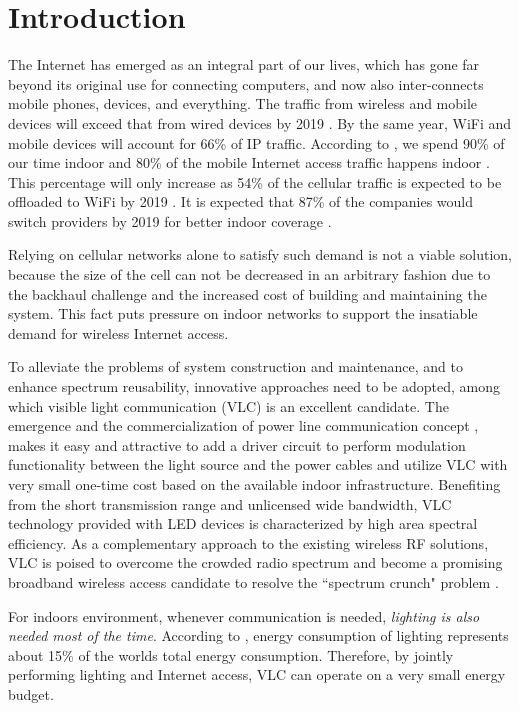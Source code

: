\documentclass[10pt,journal]{IEEEtran}
\begin{document}
\section{Introduction}\label{introduction}
The Internet has emerged as an integral part of our lives, which has gone far beyond its original use for connecting computers, and now also inter-connects mobile phones, devices, and everything. The traffic from wireless and mobile devices will exceed that from wired devices by 2019 \cite{cisco2015cisco}. By the same year, WiFi and mobile devices will account for 66\% of IP traffic. According to \cite{Ericsson2013report}, we spend 90\% of our time indoor and 80\% of the mobile Internet access traffic happens indoor \cite{Alcatel2015inbuilding,Cisco2015service}. This percentage will only increase as 54\% of the cellular traffic is expected to be offloaded to WiFi by 2019 \cite{index2015global}. It is expected that 87\% of the companies would switch providers by 2019 for better indoor coverage \cite{Alcatel2015inbuilding}.


Relying on cellular networks alone to satisfy such demand is not a viable solution, because the size of the cell can not be decreased in an arbitrary fashion due to the backhaul challenge \cite{chia2009next} and the increased cost of building and maintaining the system. This fact puts pressure on indoor networks to support the insatiable demand for wireless Internet access.


To alleviate the problems of system construction and maintenance, and to enhance spectrum reusability, innovative approaches need to be adopted, among which visible light communication (VLC) is an excellent candidate. The emergence and the commercialization of power line communication concept \cite{tsuzuki2012feasibility,tonello2008challenges}, makes it easy and attractive to add a driver circuit to perform modulation functionality between the light source and the power cables and utilize VLC with very small one-time cost based on the available indoor infrastructure. Benefiting from the short transmission range and unlicensed wide bandwidth, VLC technology provided with LED devices is characterized by high area spectral efficiency. As a complementary approach to the existing wireless RF solutions, VLC is poised to overcome the crowded radio spectrum and become a promising broadband wireless access candidate to resolve the ``spectrum crunch" problem \cite{hanchard2010fcc}.

For indoors environment, whenever communication is needed, {\it lighting is also needed most of the time}. According to \cite{lindsay2012what}, energy consumption of lighting represents about 15\% of the worlds total energy consumption. Therefore, by jointly performing lighting and Internet access, VLC can operate on a very small energy budget.
\end{document}
